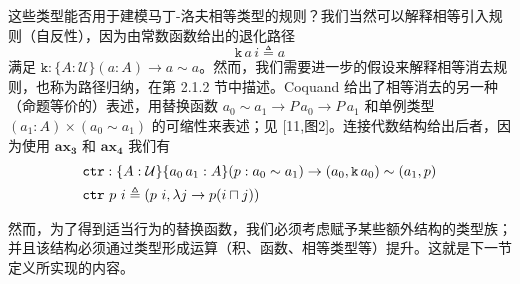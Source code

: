 \documentclass{ctexrep}
\theoremstyle{plain}
\theoremstyle{definition}
\theoremstyle{remark}
\newcommand{\ax}[1]{\mathbf{ax_{#1}}}
\begin{document}
这些类型能否用于建模马丁-洛夫相等类型的规则？我们当然可以解释相等引入规则（自反性），因为由常数函数给出的退化路径
\begin{equation}
\mathtt{k}\,a\,i \triangleq a
\end{equation}
满足 $\mathtt{k} : \{A : \mathcal{U}\}(a : A) \to a \sim a$。然而，我们需要进一步的假设来解释相等消去规则，也称为路径归纳，在第 2.1.2 节中描述。Coquand 给出了相等消去的另一种（命题等价的）表述，用替换函数 $a_0 \sim a_1 \to P\,a_0 \to P\,a_1$ 和单例类型 $(a_1 : A) \times (a_0 \sim a_1)$ 的可缩性来表述；见 [11,图2]。连接代数结构给出后者，因为使用 $\ax{3}$ 和 $\ax{4}$ 我们有
\begin{align}
&\mathtt{ctr} : \{A : \mathcal{U}\}\{a_0\,a_1 : A\}(p : a_0 \sim a_1) \to (a_0, \mathtt{k}\,a_0) \sim (a_1, p) \\
&\mathtt{ctr}\ p\ i \triangleq (p\ i, \lambda j \to p(i \sqcap j))\notag
\end{align}

然而，为了得到适当行为的替换函数，我们必须考虑赋予某些额外结构的类型族；并且该结构必须通过类型形成运算（积、函数、相等类型等）提升。这就是下一节定义所实现的内容。
\end{document}
